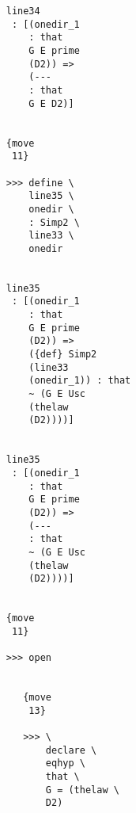 \documentclass[12pt]{article}
\begin{document}
\begin{verbatim}
                                    line34 
                                     : [(onedir_1 
                                        : that 
                                        G E prime 
                                        (D2)) => 
                                        (--- 
                                        : that 
                                        G E D2)]


                                    {move 
                                     11}

                                    >>> define \
                                        line35 \
                                        onedir \
                                        : Simp2 \
                                        line33 \
                                        onedir


                                    line35 
                                     : [(onedir_1 
                                        : that 
                                        G E prime 
                                        (D2)) => 
                                        ({def} Simp2 
                                        (line33 
                                        (onedir_1)) : that 
                                        ~ (G E Usc 
                                        (thelaw 
                                        (D2))))]


                                    line35 
                                     : [(onedir_1 
                                        : that 
                                        G E prime 
                                        (D2)) => 
                                        (--- 
                                        : that 
                                        ~ (G E Usc 
                                        (thelaw 
                                        (D2))))]


                                    {move 
                                     11}

                                    >>> open


                                       {move 
                                        13}

                                       >>> \
                                           declare \
                                           eqhyp \
                                           that \
                                           G = (thelaw \
                                           D2)



\end{verbatim}
\end{document}
